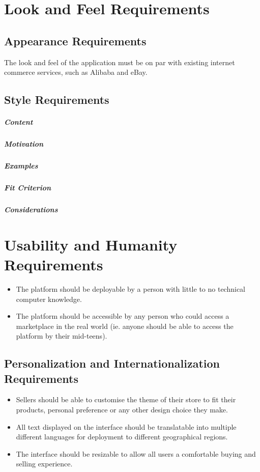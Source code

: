 \documentclass{article}
\begin{document}
\section{Look and Feel Requirements}
\subsection{Appearance Requirements}
The look and feel of the application must be on par with existing internet commerce services, such as Alibaba and eBay. 

\subsection{Style Requirements}
\subparagraph{Content}
\subparagraph{Motivation}
\subparagraph{Examples}
\subparagraph{Fit Criterion}
\subparagraph{Considerations}

\section{Usability and Humanity Requirements}
\begin{itemize}
\item
The platform should be deployable by a person with little to no technical computer knowledge.

\item
The platform should be accessible by any person who could access a marketplace in the real world (ie. anyone should be able to access the platform by their mid-teens).
\end{itemize}

\subsection{Personalization and Internationalization Requirements}
\begin{itemize}
\item
Sellers should be able to customise the theme of their store to fit their products, personal preference or any other design choice they make. 

\item
All text displayed on the interface should be translatable into multiple different languages for deployment to different geographical regions.

\item
The interface should be resizable to allow all users a comfortable buying and selling experience.
\end{itemize}
\end{document}
